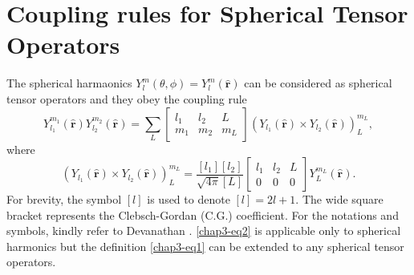\section{Coupling rules for Spherical Tensor Operators} \label{chap3-sec2}

The spherical harmaonics $Y^m_l(\theta, \phi)= Y_l^m (\hat{\mathbf{r}})$ can be considered as spherical tensor operators and they obey the coupling rule
\begin{equation}
Y_{l_1}^{m_1} (\hat{\mathbf{r}}) Y_{l_2}^{m_2} (\hat{\mathbf{r}}) = \sum_L 
	\begin{bmatrix}
		l_1 & l_2 & L\\
		m_1 &m_2  & m_L
	\end{bmatrix}
(Y_{l_1} (\hat{\mathbf{r}}) \times Y_{l_2} (\hat{\mathbf{r}}))^{m_L}_{L}, \label{chap3-eq1}
\end{equation}
where
\begin{equation}
(Y_{l_1}  (\hat{\mathbf{r}})  \times Y_{l_2} (\hat{\mathbf{r}}) )^{m_L}_{L} = \frac{[l_1][l_2]}{\sqrt{4\pi}[L]}
\begin{bmatrix}
l_1 & l_2 & L\\
0 & 0 & 0
\end{bmatrix}
Y_{L}^{m_L} (\hat{\mathbf{r}}). \label{chap3-eq2} 
\end{equation}
For brevity, the symbol $[l]$ is used to denote $[l] = 2l + 1$. The wide square bracket represents the Clebsch-Gordan (C.G.) coefficient. For the notations and symbols, kindly refer to Devanathan \cite{key11,key12}. \eqref{chap3-eq2} is applicable only to spherical harmonics but the definition \eqref{chap3-eq1} can be extended to any spherical tensor operators.

